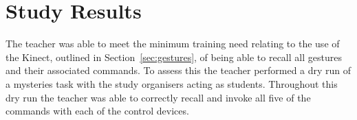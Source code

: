 \documentclass[manuscript, review, screen]{acmart}
\begin{document}


\section{Study Results}
\label{sec:evaluationresults}

The teacher was able to meet the minimum training need relating to the use of the Kinect, outlined in Section~\ref{sec:gestures}, of being able to recall all gestures and their associated commands.
To assess this the teacher performed a dry run of a mysteries task with the study organisers acting as students.
Throughout this dry run the teacher was able to correctly recall and invoke all five of the commands with each of the control devices.
\end{document}
